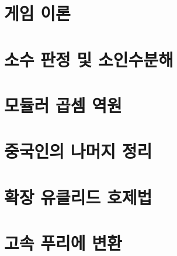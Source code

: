 \chapter{게임 이론}


\chapter{소수 판정 및 소인수분해}


\chapter{모듈러 곱셈 역원}


\chapter{중국인의 나머지 정리}


\chapter{확장 유클리드 호제법}


\chapter{고속 푸리에 변환}

